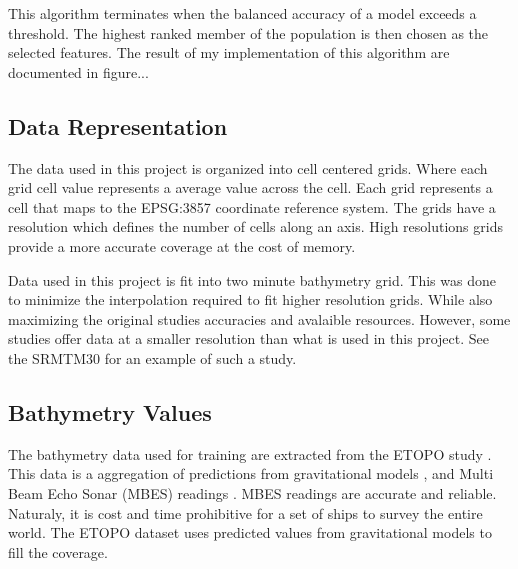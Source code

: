 \par
This algorithm terminates when the balanced accuracy of a model exceeds a threshold.
The highest ranked member of the population is then chosen as the selected features.
The result of my implementation of this algorithm are documented in figure...

\subsection{Data Representation}
The data used in this project is organized into cell centered grids.
Where each grid cell value represents a average value across the cell.
Each grid represents a cell that maps to the EPSG:3857 coordinate reference system.
The grids have a resolution which defines the number of cells along an axis.
High resolutions grids provide a more accurate coverage at the cost of memory.

\par
Data used in this project is fit into two minute bathymetry grid. 
This was done to minimize the interpolation required to fit higher resolution grids.
While also maximizing the original studies accuracies and avalaible resources.
However, some studies offer data at a smaller resolution than what is used in this project.
See the SRMTM30 \cite{becker2009global} for an example of such a study.

\subsection{Bathymetry Values}
The bathymetry data used for training are extracted from the ETOPO study \cite{national1988etopo}.
This data is a aggregation of predictions from gravitational models \cite{smith1997global} \cite{smith1994bathymetric}, and Multi Beam Echo Sonar (MBES) readings \cite{farr1980multibeam}.
MBES readings are accurate and reliable. 
Naturaly, it is cost and time prohibitive for a set of ships to survey the entire world.
The ETOPO dataset uses predicted values from gravitational models to fill the coverage.


